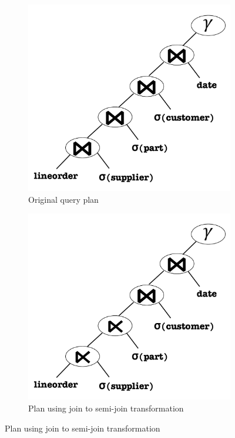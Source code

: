 \begin{figure}[t]
\centering
\begin{subfigure}[bt]{0.3\textwidth}
  \centering
   \includegraphics[width=1.0\textwidth,
                    height=0.75\textwidth]{system/figures/Q41-original.pdf}
   \caption{Original query plan}
   \label{fig-q41-original}
\end{subfigure} %
\begin{subfigure}[bt]{0.3\textwidth}
  \centering
   \includegraphics[width=1.0\textwidth,
                    height=0.75\textwidth]{system/figures/Q41-semijoin.pdf}
   \caption{Plan using join to semi-join transformation}
   \label{fig-q41-semijoin}
\end{subfigure} %

\end{figure}
